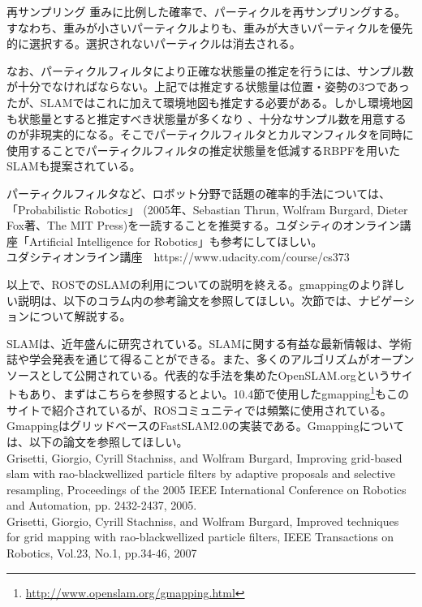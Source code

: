 \circled{\thenum} 再サンプリング
重みに比例した確率で、パーティクルを再サンプリングする。すなわち、重みが小さいパーティクルよりも、重みが大きいパーティクルを優先的に選択する。選択されないパーティクルは消去される。

なお、パーティクルフィルタにより正確な状態量の推定を行うには、サンプル数が十分でなければならない。上記では推定する状態量は位置・姿勢の3つであったが、SLAMではこれに加えて環境地図も推定する必要がある。しかし環境地図も状態量とすると推定すべき状態量が多くなり  、十分なサンプル数を用意するのが非現実的になる。そこでパーティクルフィルタとカルマンフィルタを同時に使用することでパーティクルフィルタの推定状態量を低減するRBPFを用いたSLAMも提案されている。

\begin{exercise}[パーティクルフィルタの解説書]
  パーティクルフィルタなど、ロボット分野で話題の確率的手法については、「Probabilistic Robotics」   (2005年、Sebastian Thrun, Wolfram Burgard, Dieter Fox著、The MIT Press)を一読することを推奨する。ユダシティのオンライン講座「Artificial Intelligence for Robotics」も参考にしてほしい。\\
  ユダシティオンライン講座　https://www.udacity.com/course/cs373
\end{exercise}

以上で、ROSでのSLAMの利用についての説明を終える。gmappingのより詳しい説明は、以下のコラム内の参考論文を参照してほしい。次節では、ナビゲーションについて解説する。

\begin{exercise}[OpenSLAMとGmapping]
  SLAMは、近年盛んに研究されている。SLAMに関する有益な最新情報は、学術誌や学会発表を通じて得ることができる。また、多くのアルゴリズムがオープンソースとして公開されている。代表的な手法を集めたOpenSLAM.orgというサイトもあり、まずはこちらを参照するとよい。10.4節で使用したgmapping\footnote{\url{http://www.openslam.org/gmapping.html}}もこのサイトで紹介されているが、ROSコミュニティでは頻繁に使用されている。GmappingはグリッドベースのFastSLAM2.0の実装である。Gmappingについては、以下の論文を参照してほしい。\\
  Grisetti, Giorgio, Cyrill Stachniss, and Wolfram Burgard, Improving grid-based slam with rao-blackwellized particle filters by adaptive proposals and selective resampling, Proceedings of the 2005 IEEE International Conference on Robotics and Automation, pp. 2432-2437, 2005.\\
  Grisetti, Giorgio, Cyrill Stachniss, and Wolfram Burgard, Improved techniques for grid mapping with rao-blackwellized particle filters, IEEE Transactions on Robotics, Vol.23, No.1, pp.34-46, 2007
\end{exercise}

